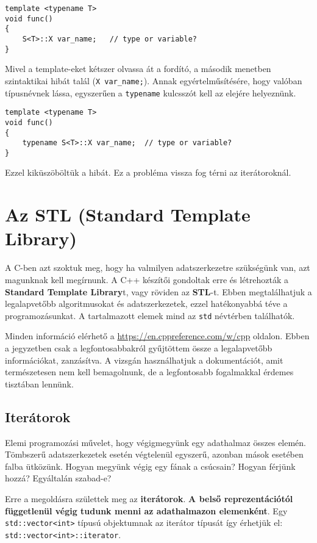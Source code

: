 \documentclass[a4paper, 11pt, oneside]{book}
\begin{document}
\begin{lstlisting}[style=cppstyle]
template <typename T>
void func()
{
	S<T>::X var_name;	// type or variable?
}
\end{lstlisting}

Mivel a template-eket kétszer olvassa át a fordító, a második menetben szintaktikai hibát talál (\verb*|X var_name;|). Annak egyértelműsítésére, hogy valóban típusnévnek lássa, egyszerűen a \verb*|typename| kulcsszót kell az elejére helyeznünk.

\begin{lstlisting}[style=cppstyle]
template <typename T>
void func()
{
	typename S<T>::X var_name;	// type or variable?
}
\end{lstlisting}

Ezzel kiküszöböltük a hibát. Ez a probléma vissza fog térni az iterátoroknál.

\section{Az STL (Standard Template Library)}

A C-ben azt szoktuk meg, hogy ha valmilyen adatszerkezetre szükségünk van, azt magunknak kell megírnunk. A C++ készítői gondoltak erre és létrehozták a \textbf{Standard Template Library}t, vagy röviden az \textbf{STL}-t. Ebben megtalálhatjuk a legalapvetőbb algoritmusokat és adatszerkezetek, ezzel hatékonyabbá téve a programozásunkat. A tartalmazott elemek mind az \verb*|std| névtérben találhatók.

Minden információ elérhető a \url{https://en.cppreference.com/w/cpp} oldalon. Ebben a jegyzetben csak a legfontosabbakról gyűjtöttem össze a legalapvetőbb információkat, zanzásítva. A vizsgán használhatjuk a dokumentációt, amit természetesen nem kell bemagolnunk, de a legfontosabb fogalmakkal érdemes tisztában lennünk.

\subsection{Iterátorok}

Elemi programozási művelet, hogy végigmegyünk egy adathalmaz összes elemén. Tömbszerű adatszerkezetek 
esetén végtelenül egyszerű, azonban mások esetében falba ütközünk. Hogyan megyünk végig egy fának a csúcsain? Hogyan férjünk hozzá? Egyáltalán szabad-e?

Erre a megoldásra születtek meg az \textbf{iterátorok}. \textbf{A belső reprezentációtól függetlenül végig tudunk menni az adathalmazon elemenként}. Egy \verb*|std::vector<int>| típusú objektumnak az iterátor típusát így érhetjük el: \verb*|std::vector<int>::iterator|.
\end{document}
